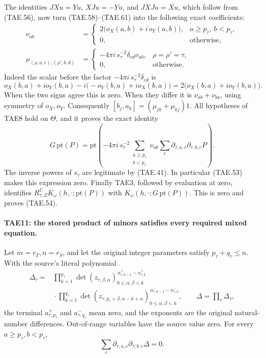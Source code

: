 The identities \(JXu=Yu\), \(XJu=-Yu\), and
\(JXJu=Xu\), which follow from (TAE.56), now turn
(TAE.58)--(TAE.61) into the following exact coefficients:
\[
 \begin{split}
 \nu_{ab}&=
 \begin{cases}
   2\bigl(o_X(a,b)+i\,o_Y(a,b)\bigr),
                 &a\ge p_\tau,\ b<p_\tau,\\
   0,&\text{otherwise},
 \end{cases}\\
 \mu_{(\rho,a,c),(\rho',b,d)}
   &=\begin{cases}
    -4\pi i\,s_\tau^{-2}\delta_{cd}\nu_{ab},
                         &\rho=\rho'=\tau,\\
    0,&\text{otherwise}.
   \end{cases}
 \end{split}
 \tag{TAE.62}
\]
Indeed the scalar before the factor
\(-4\pi i\,s_\tau^{-2}\delta_{cd}\) is
\[
 o_X(b,a)+i o_Y(b,a)
       -i\bigl(-o_Y(b,a)+i o_X(b,a)\bigr)
                   =2\bigl(o_X(b,a)+i o_Y(b,a)\bigr).
 \tag{TAE.63}
\]
When the two signs agree this is zero.  When they differ
it is \(\nu_{ab}+\nu_{ba}\), using symmetry of \(o_X,o_Y\).
Consequently \([b_j,a_k]=(\mu_{jk}+\mu_{kj})1\).
All hypotheses of TAE8 hold on \(\Theta\), and it proves
the exact identity
\[
 G\,\mathrm{pt}(P)=
 \mathrm{pt}\left(
   -4\pi i\,s_\tau^{-2}
       \sum_{\substack{a\ge p_\tau\\b<p_\tau}}
           \nu_{ab}\sum_c
             \partial_{\tau,a,c}\partial_{\tau,b,c}P
              \right).
 \tag{TAE.64}
\]
The inverse powers of \(s_\tau\) are legitimate by (TAE.41).
In particular (TAE.53) makes this expression zero.
Finally TAE3, followed by evaluation at zero, identifies
\(R_{\tau,Z}^{\mathbb C}K_\omega(h,\cdot;\mathrm{pt}(P))\)
with \(K_\omega(h,\cdot;G\,\mathrm{pt}(P))\).
This is zero and proves (TAE.54).

\paragraph{TAE11: the stored product of minors satisfies every required mixed equation.}
\label{claim:TAE11}
Let \(m=r_T,n=r_S\), and let the original integer parameters
satisfy \(p_\tau+q_\tau\le n\).
With the source's literal polynomial
\[
 \begin{split}
 \Delta_\tau={}&
 \prod_{k=1}^{p_\tau}
   \det(z_{\tau,\beta,\alpha})_{0\le\alpha,\beta<k}
                   ^{\,a^+_{\tau,k-1}-a^+_{\tau,k}}\\
 &{}\cdot
 \prod_{k=1}^{q_\tau}
   \det(z_{\tau,p_\tau+\beta,n-k+\alpha})
                      _{0\le\alpha,\beta<k}
                   ^{\,a^-_{\tau,k-1}-a^-_{\tau,k}},
 \qquad \Delta=\prod_\tau\Delta_\tau ,
 \end{split}
 \tag{TAE.65}
\]
the terminal \(a^+_{\tau,p_\tau}\) and
\(a^-_{\tau,q_\tau}\) mean zero, and the exponents are
the original natural-number differences.
Out-of-range variables have the source value zero.
For every \(a\ge p_\tau,b<p_\tau\),
\[
       \sum_c
          \partial_{\tau,a,c}\partial_{\tau,b,c}\Delta=0.
 \tag{TAE.66}
\]

